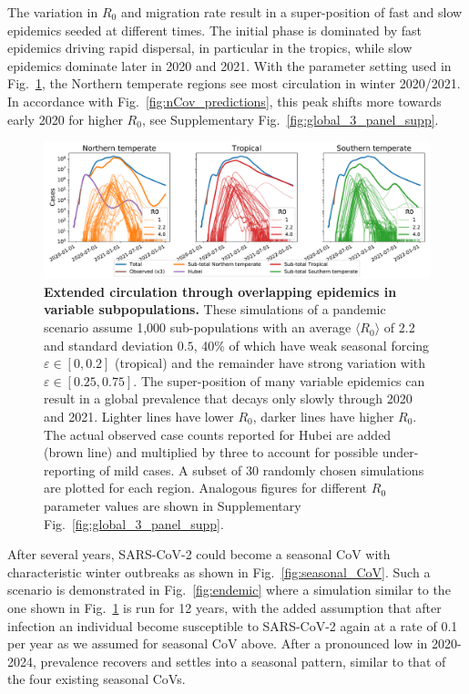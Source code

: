 \documentclass[rmp, reprint, superscriptaddress, floatfix,amsmath]{revtex4-1}
\newcommand{\forcing}{\varepsilon}
\begin{document}
The variation in $R_0$ and migration rate result in a super-position of fast and slow epidemics seeded at different times.
The initial phase is dominated by fast epidemics driving rapid dispersal, in particular in the tropics, while slow epidemics dominate later in 2020 and 2021.
With the parameter setting used in Fig.~\ref{fig:global_3_panel}, the Northern temperate regions see most circulation in winter 2020/2021.
In accordance with Fig.~\ref{fig:nCov_predictions}, this peak shifts more towards early 2020 for higher $R_0$, see Supplementary Fig.~\ref{fig:global_3_panel_supp}.

\begin{figure}[tb]
    \centering
    \includegraphics[width=\textwidth]{figures/fig_4.pdf}
    \caption{{\bf Extended circulation through overlapping epidemics in variable subpopulations.} These simulations of a pandemic scenario assume 1,000 sub-populations with an average $\langle R_0\rangle$ of 2.2 and standard deviation $0.5$, 40\% of which have weak seasonal forcing $\forcing \in [0,0.2]$ (tropical) and the remainder have strong variation with $\forcing \in [0.25,0.75]$. The super-position of many variable epidemics can result in a global prevalence that decays only slowly through 2020 and 2021.
    Lighter lines have lower $R_0$, darker lines have higher $R_0$.
    The actual observed case counts reported for Hubei are added (brown line) and multiplied by three to account for possible under-reporting of mild cases. A subset of 30 randomly chosen simulations are plotted for each region.
    Analogous figures for different $R_0$ parameter values are shown in Supplementary Fig.~\ref{fig:global_3_panel_supp}.}
    \label{fig:global_3_panel}
\end{figure}

After several years, SARS-CoV-2 could become a seasonal CoV with characteristic winter outbreaks as shown in Fig.~\ref{fig:seasonal_CoV}.
Such a scenario is demonstrated in Fig.~\ref{fig:endemic} where a simulation similar to the one shown in Fig.~\ref{fig:global_3_panel} is run for 12 years, with the added assumption that after infection an individual become susceptible to SARS-CoV-2 again at a rate of 0.1 per year as we assumed for seasonal CoV above.
After a pronounced low in 2020-2024, prevalence recovers and settles into a seasonal pattern, similar to that of the four existing seasonal CoVs.
\end{document}
